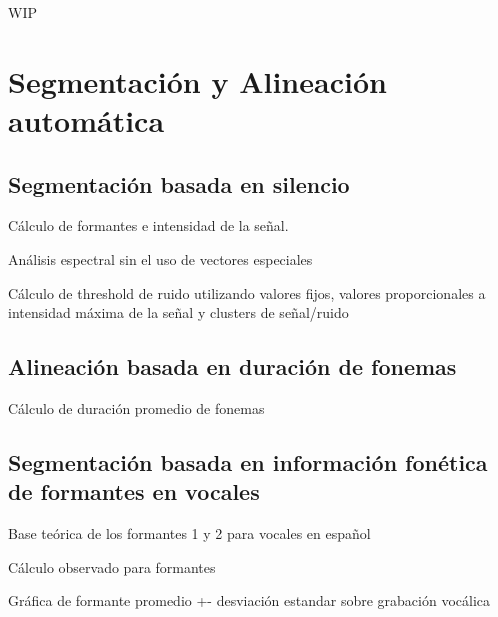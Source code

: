 \documentclass[a4paper,12pt,twoside]{report}
\begin{document}
WIP

\chapter{Segmentación y Alineación automática}

\section{Segmentación basada en silencio}

Cálculo de formantes e intensidad de la señal.

Análisis espectral sin el uso de vectores especiales

Cálculo de threshold de ruido utilizando valores fijos, valores proporcionales a intensidad máxima de la señal y clusters de señal/ruido

\section{Alineación basada en duración de fonemas}

Cálculo de duración promedio de fonemas



\section{Segmentación basada en información fonética de formantes en vocales}

Base teórica de los formantes 1 y 2 para vocales en español

Cálculo observado para formantes 

Gráfica de formante promedio +- desviación estandar sobre grabación vocálica


% 
% 

\end{document}
